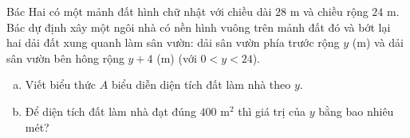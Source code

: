 \begin{bt}%
Bác Hai có một mảnh đất hình chữ nhật với chiều dài $28\text{ m}$ và chiều rộng $24\text{ m}$. Bác dự định xây một ngôi nhà có nền hình vuông trên mảnh đất đó và bớt lại hai dải đất xung quanh làm sân vườn: dải sân vườn phía trước rộng $y$ (m) và dải sân vườn bên hông rộng $y + 4$ (m) (với $0 < y < 24$).
\begin{enumerate}[a)]
    \item Viết biểu thức $A$ biểu diễn diện tích đất làm nhà theo $y$.
    \item Để diện tích đất làm nhà đạt đúng $400\text{ m}^2$ thì giá trị của $y$ bằng bao nhiêu mét?
\end{enumerate}
\end{bt}

